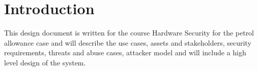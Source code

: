 
\section{Introduction}
\label{introduction}
This design document is written for the course Hardware Security for the petrol allowance case and will describe the use cases, assets and stakeholders, security requirements, threats and abuse cases, attacker model and will include a high level design of the system. 
